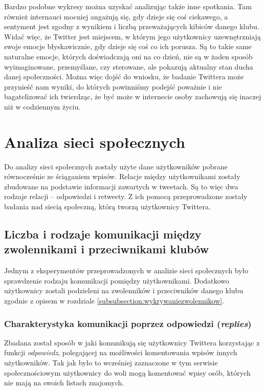Bardzo podobne wykresy można uzyskać analizując także inne spotkania.
Tam również internauci mocniej angażują się, gdy dzieje się coś ciekawego, a
sentyment jest zgodny z wynikiem i liczbą przeważających kibiców danego klubu.
Widać więc, że Twitter jest miejscem, w którym jego użytkownicy uzewnętrzniają
swoje emocje błyskawicznie, gdy dzieje się coś co ich porusza.
Są to takie same naturalne emocje, których doświadczają oni na co dzień, nie są
w żaden sposób wyimaginowane, przemyślane, czy sterowane, ale pokazują aktualny
stan ducha danej społeczności. Można więc dojść do wniosku, że badanie Twittera
może przynieść nam wyniki, do których powinniśmy podejść poważnie i nie
bagatelizować ich twierdząc, że być może w internecie osoby zachowują się
inaczej niż w codziennym życiu.





\section{Analiza sieci społecznych}
\label{section:analizaspoleczna}
Do analizy sieci społecznych zostały użyte dane użytkowników pobrane 
równocześnie ze ściąganiem wpisów. Relacje między użytkownikami zostały
zbudowane na podstawie informacji zawartych w tweetach. Są to więc
dwa rodzaje relacji -- odpowiedzi i retweety. Z ich pomocą przeprowadzone
zostały badania nad siecią społeczną, którą tworzą użytkownicy Twittera. 






\subsection{Liczba i rodzaje komunikacji między zwolennikami i przeciwnikami klubów}
\label{subsection:rodzajekomunikacji}

Jednym z eksperymentów przeprowadzonych w analizie sieci społecznych było
sprawdzenie rodzaju komunikacji pomiędzy użytkownikami. 
Dodatkowo użytkownicy zostali podzieleni na zwolenników i przeciwników danego 
klubu zgodnie z opisem w rozdziale \ref{subsubsection:wykrywaniezwolennikow}.


\subsubsection{Charakterystyka komunikacji poprzez odpowiedzi (\textit{replies})}
Zbadana został sposób w jaki komunikują się użytkownicy Twittera korzystając
z funkcji \textit{odpowiedz}, polegającej na możliwości komentowania wpisów
innych użytkowników. Tak jak było to wcześniej zaznaczone w tym serwisie
społecznościowym użytkownicy do woli mogą komentować wpisy osób, których
nie mają na swoich listach znajomych.

